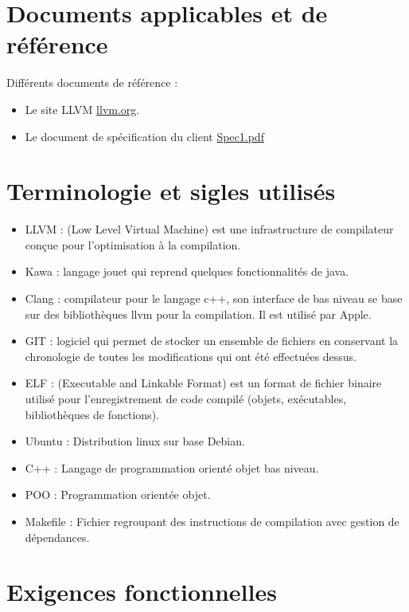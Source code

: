 \documentclass{../res/univ-projet}
\begin{document}
\section{Documents applicables et de référence}
Différents documents de référence :
\begin{itemize}

\item Le site LLVM \href{http://llvm.org}{llvm.org}.
\item Le document de spécification du client \href{file:../client/spec1.pdf}{Spec1.pdf}
\end{itemize}
\newpage
\section{Terminologie et sigles utilisés}
  \begin{itemize}
  	\item LLVM : (Low Level Virtual Machine) est une infrastructure de compilateur conçue pour l'optimisation à la compilation.
	\item Kawa : langage jouet qui reprend quelques fonctionnalités de java.
	\item Clang : compilateur pour le langage c++, son interface de bas niveau  se base sur des bibliothèques llvm pour la compilation. Il est utilisé par Apple.
	\item GIT : logiciel qui permet de stocker un ensemble de fichiers en conservant la chronologie de toutes les modifications qui ont été effectuées dessus.
	\item ELF : (Executable and Linkable Format) est un format de fichier binaire utilisé pour l'enregistrement de code compilé (objets, exécutables, bibliothèques de fonctions).
	\item Ubuntu : Distribution linux sur base Debian.
	\item C++ : Langage de programmation orienté objet bas niveau.
	\item POO : Programmation orientée objet.
	\item Makefile : Fichier regroupant des instructions de compilation avec gestion de dépendances.
  \end{itemize}

\section{Exigences fonctionnelles}
\end{document}
